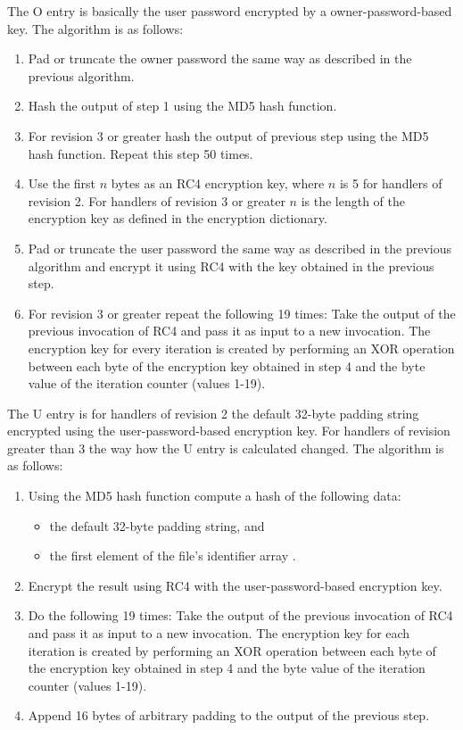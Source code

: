 \documentclass[11pt,oneside]{fithesis2}
\begin{document}
The O entry is basically the user password encrypted by a owner-password-based key. The algorithm is as follows:

\begin{enumerate}
\setlength\itemsep{0.1em}
\item{Pad or truncate the owner password the same way as described in the previous algorithm.}
\item{Hash the output of step 1 using the MD5 hash function.}
\item{For revision 3 or greater hash the output of previous step using the MD5 hash function. Repeat this step 50 times.}
\item{Use the first $n$ bytes as an RC4 encryption key, where $n$ is 5 for handlers of revision 2. For handlers of revision 3 or greater $n$ is the length of the encryption key as defined in the encryption dictionary.}
\item{Pad or truncate the user password the same way as described in the previous algorithm and encrypt it using RC4 with the key obtained in the previous step.}
\item{For revision 3 or greater repeat the following 19 times: Take the output of the previous invocation of RC4 and pass it as input to a new invocation. The encryption key for every iteration is created by performing an XOR operation between each byte of the encryption key obtained in step 4 and the byte value of the iteration counter (values 1-19).}
\end{enumerate}

The U entry is for handlers of revision 2 the default 32-byte padding string encrypted using the user-password-based encryption key. For handlers of revision greater than 3 the way how the U entry is calculated changed. The algorithm is as follows:

\begin{enumerate}
\setlength\itemsep{0.1em}
\item{Using the MD5 hash function compute a hash of the following data:}
\begin{itemize}
		\item{the default 32-byte padding string, and}
		\item{the first element of the file's identifier array \cite[p. 43]{pdf_spec}.}
\end{itemize}
\item{Encrypt the result using RC4 with the user-password-based encryption key.}
\item{Do the following 19 times: Take the output of the previous invocation of RC4 and pass it as input to a new invocation. The encryption key for each iteration is created by performing an XOR operation between each byte of the encryption key obtained in step 4 and the byte value of the iteration counter (values 1-19).}
\item{Append 16 bytes of arbitrary padding to the output of the previous step.}
\end{enumerate}
\end{document}
